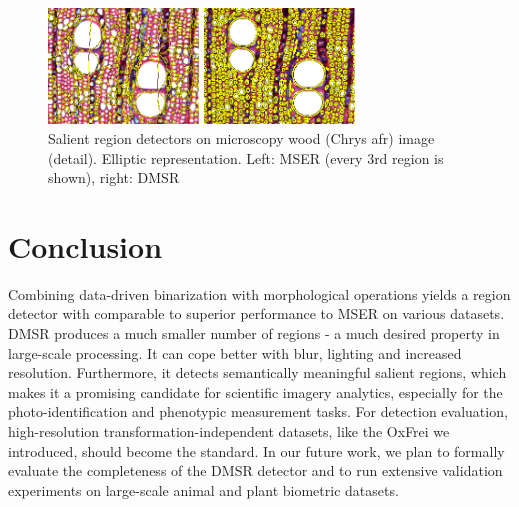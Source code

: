 \documentclass[conference,compsoc]{IEEEtran}
\begin{document}
\begin{figure}[htb]
\begin{minipage}[b]{.49\linewidth}
  \centering
  \centerline{\includegraphics[width=4cm]{mser_wood_C}}
\end{minipage}
\hfill
\begin{minipage}[b]{0.49\linewidth}
  \centering
  \centerline{\includegraphics[width=4cm]{dmsr_wood_C}}
\end{minipage}
\vspace{-0.25cm}
\caption{Salient region detectors on microscopy wood (Chrys afr) image (detail). Elliptic representation. Left: MSER (every $3$rd region is shown), right: DMSR}
\label{fig:wood_C}

\end{figure}

\section{Conclusion}

Combining data-driven binarization with morphological operations yields a region detector with comparable to superior performance to MSER on various datasets. DMSR produces a much smaller number of regions - a much desired property in large-scale processing. It can cope better with blur, lighting and increased resolution. Furthermore, it detects semantically meaningful salient regions, which makes it a promising candidate for scientific imagery analytics, especially for the photo-identification and phenotypic measurement tasks. For detection evaluation, high-resolution transformation-independent datasets, like the OxFrei we introduced, should become the standard. In our future work, we plan to formally evaluate the completeness of the DMSR detector and to run extensive validation experiments on large-scale animal and plant biometric datasets.
\end{document}
